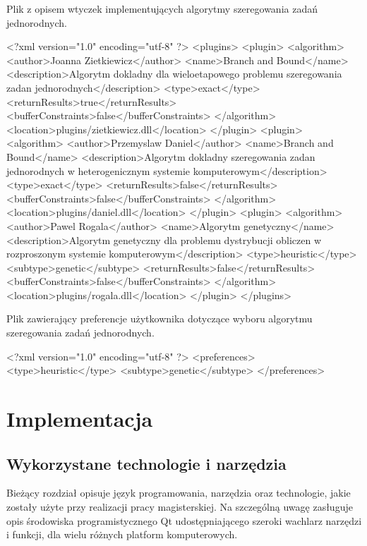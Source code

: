 \clearpage
\begin{listing}
\caption{Plik z opisem wtyczek implementujących algorytmy szeregowania zadań jednorodnych.}\label{lst2}
\begin{codeblock}
<?xml version="1.0" encoding="utf-8" ?> 
<plugins>
<plugin>
<algorithm>
<author>Joanna Zietkiewicz</author>
<name>Branch and Bound</name>
<description>Algorytm dokladny dla wieloetapowego problemu 
szeregowania zadan jednorodnych</description>
<type>exact</type>
<returnResults>true</returnResults>
<bufferConstraints>false</bufferConstraints>
</algorithm>
<location>plugins/zietkiewicz.dll</location>
</plugin>
<plugin>
<algorithm>
<author>Przemyslaw Daniel</author>
<name>Branch and Bound</name>
<description>Algorytm dokladny szeregowania zadan jednorodnych 
w heterogenicznym systemie komputerowym</description>
<type>exact</type>
<returnResults>false</returnResults>
<bufferConstraints>false</bufferConstraints>
</algorithm>
<location>plugins/daniel.dll</location>
</plugin>
<plugin>
<algorithm>
<author>Pawel Rogala</author>
<name>Algorytm genetyczny</name>
<description>Algorytm genetyczny dla problemu dystrybucji 
obliczen w rozproszonym systemie komputerowym</description>
<type>heuristic</type>
<subtype>genetic</subtype>
<returnResults>false</returnResults>
<bufferConstraints>false</bufferConstraints>
</algorithm>
<location>plugins/rogala.dll</location>
</plugin>
</plugins>
\end{codeblock}
\end{listing}

\begin{listing}
\caption{Plik zawierający preferencje użytkownika dotyczące wyboru algorytmu szeregowania zadań jednorodnych.}\label{lst3}
\begin{codeblock}
<?xml version="1.0" encoding="utf-8" ?> 
<preferences>
<type>heuristic</type>
<subtype>genetic</subtype>
</preferences>
\end{codeblock}
\end{listing}



\chapter{Implementacja}

\section{Wykorzystane technologie i narzędzia}

Bieżący rozdział opisuje język programowania, narzędzia oraz technologie, jakie zostały użyte przy realizacji pracy magisterskiej. Na szczególną 
uwagę zasługuje opis środowiska programistycznego Qt udostępniającego szeroki wachlarz narzędzi i funkcji, dla wielu różnych platform komputerowych.

